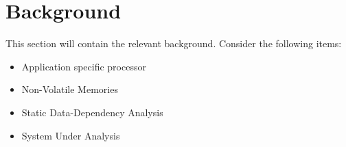\section{Background}
This section will contain the relevant background. Consider the following items:
\begin{itemize}
\item Application specific processor
\item Non-Volatile Memories
\item Static Data-Dependency Analysis
\item System Under Analysis
\end{itemize}
